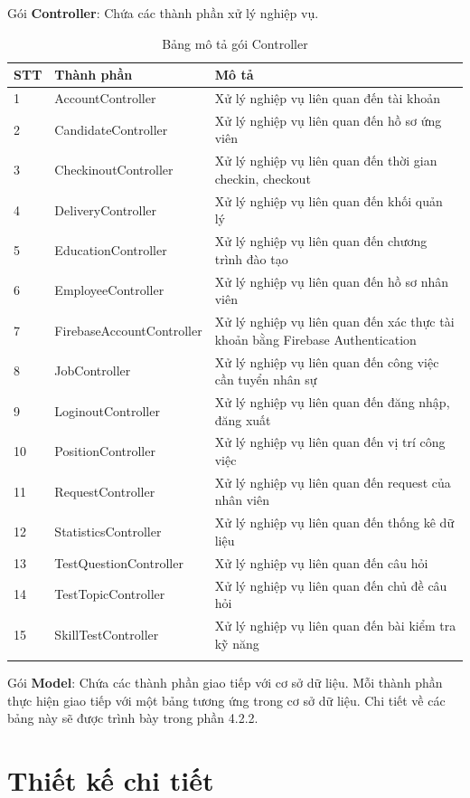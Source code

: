 \documentclass[../DoAn.tex]{subfiles}
\begin{document}
Gói \textbf{Controller}: Chứa các thành phần xử lý nghiệp vụ.
\begin{longtable}{|p{}|p{}|p{}|}
\hline
\textbf{STT} & \textbf{Thành phần} & \textbf{Mô tả} \\ \hline
1   & AccountController & Xử lý nghiệp vụ liên quan đến tài khoản \\ \hline
2   & CandidateController & Xử lý nghiệp vụ liên quan đến hồ sơ ứng viên \\ \hline
3   & CheckinoutController & Xử lý nghiệp vụ liên quan đến thời gian checkin, checkout \\ \hline
4   & DeliveryController & Xử lý nghiệp vụ liên quan đến khối quản lý \\ \hline
5   & EducationController & Xử lý nghiệp vụ liên quan đến chương trình đào tạo \\ \hline
6   & EmployeeController & Xử lý nghiệp vụ liên quan đến hồ sơ nhân viên  \\ \hline
7   & FirebaseAccountController & Xử lý nghiệp vụ liên quan đến xác thực tài khoản bằng Firebase Authentication  \\ \hline
8   & JobController & Xử lý nghiệp vụ liên quan đến công việc cần tuyển nhân sự  \\ \hline
9   & LoginoutController & Xử lý nghiệp vụ liên quan đến đăng nhập, đăng xuất \\ \hline
10   & PositionController & Xử lý nghiệp vụ liên quan đến vị trí công việc \\ \hline
11   & RequestController & Xử lý nghiệp vụ liên quan đến request của nhân viên \\ \hline
12   & StatisticsController & Xử lý nghiệp vụ liên quan đến thống kê dữ liệu \\ \hline
13   & TestQuestionController & Xử lý nghiệp vụ liên quan đến câu hỏi \\ \hline
14   & TestTopicController & Xử lý nghiệp vụ liên quan đến chủ đề câu hỏi \\ \hline
15   & SkillTestController & Xử lý nghiệp vụ liên quan đến bài kiểm tra kỹ năng \\ \hline
\caption{Bảng mô tả gói Controller}
\end{longtable}

Gói \textbf{Model}: Chứa các thành phần giao tiếp với cơ sở dữ liệu. Mỗi thành phần thực hiện giao tiếp với một bảng tương ứng trong cơ sở dữ liệu. Chi tiết về các bảng này sẽ được trình bày trong phần 4.2.2. 

\section{Thiết kế chi tiết}
\end{document}
